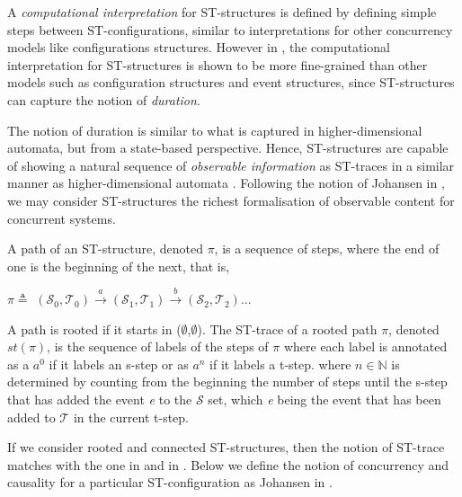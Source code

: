     A \emph{computational interpretation} for ST-structures is defined by defining simple steps between ST-configurations, similar to interpretations for other concurrency models like configurations structures. However in \cite[Theorem 3.10]{Johansen16STstruct}, the computational interpretation for ST-structures is shown to be more fine-grained than other models such as configuration structures and event structures, since ST-structures can capture the notion of \emph{duration}.
    
    The notion of duration is similar to what is captured in higher-dimensional automata, but from a state-based perspective. Hence, ST-structures are capable of showing a natural sequence of \emph{observable information} as ST-traces in a similar manner as higher-dimensional automata \cite[Section 7.3]{Glabbeek06HDA}. Following the notion of Johansen in \cite{Johansen16STstruct}, we may consider ST-structures the richest formalisation of observable content for concurrent systems.
    
    \begin{definition}
        \label{def:paths and traces}
        A path of an ST-structure, denoted $\pi$, is a sequence of steps, where the end of one is the beginning of the next, that is,
        
        \begin{center}
            $\pi \triangleq$ $(\mathcal{S}_{0},\mathcal{T}_{0})\xrightarrow{a}(\mathcal{S}_{1},\mathcal{T}_{1})\xrightarrow{b}(\mathcal{S}_{2},\mathcal{T}_{2})$...    
        \end{center}
        
        A path is rooted if it starts in ($\emptyset$,$\emptyset$). The ST-trace of a rooted path $\pi$, denoted $st(\pi)$, is the sequence of labels of the steps of $\pi$ where each label is annotated as a $a^{0}$ if it labels an s-step or as $a^{n}$ if it labels a t-step. where $n \in  \mathbb{N}$ is determined by counting from the beginning the number of steps until the s-step that has added the event \emph{e} to the $\mathcal{S}$ set, which \emph{e} being the event that has been added to $\mathcal{T}$ in the current t-step.
    \end{definition}
    
    If we consider rooted and connected ST-structures, then the notion of ST-trace matches with the one in \cite[Definition 2.5]{GlabbeekV97splitting} and in \cite[Section 7.3]{Glabbeek06HDA}. Below we define the notion of concurrency and causality for a particular ST-configuration as Johansen in \cite{Johansen16STstruct}.
    
